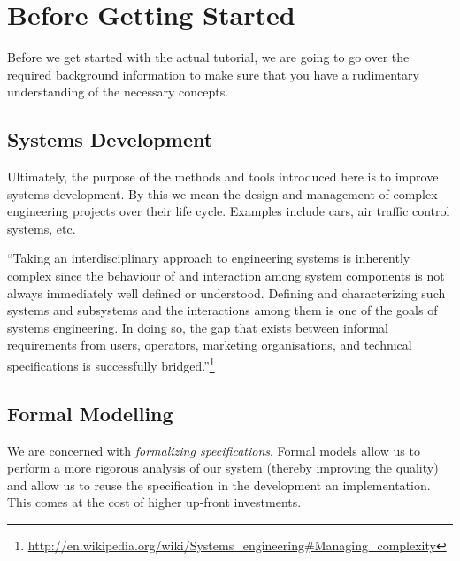 \section{Before Getting Started}
\label{tut_before_getting_started}

Before we get started with the actual tutorial, we are going to go over the required background information to make sure that you have a rudimentary understanding of the necessary concepts.


\subsection{Systems Development}
\label{tut_systems_development}

Ultimately, the purpose of the methods and tools introduced here is to improve systems development.  By this we mean the design and management of complex engineering projects over their life cycle. Examples include cars, air traffic control systems, etc.

``Taking an interdisciplinary approach to engineering systems is inherently complex since the behaviour of and interaction among system components is not always immediately well defined or understood. Defining and characterizing such systems and subsystems and the interactions among them is one of the goals of systems engineering. In doing so, the gap that exists between informal requirements from users, operators, marketing organisations, and technical specifications is successfully bridged.''\footnote{\url{http://en.wikipedia.org/wiki/Systems_engineering\#Managing_complexity}}

\subsection{Formal Modelling}
\label{tut_formal_modelling}

We are concerned with \textit{formalizing specifications}.  Formal models allow us to perform a more rigorous analysis of our system (thereby improving the quality) and allow us to reuse the specification in the development an implementation.  This comes at the cost of higher up-front investments.

